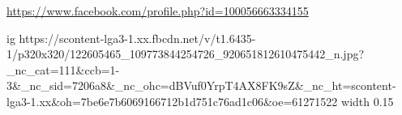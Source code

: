  
 
 
 
 

\url{https://www.facebook.com/profile.php?id=100056663334155}\par
\ifcmt
  ig https://scontent-lga3-1.xx.fbcdn.net/v/t1.6435-1/p320x320/122605465_109773844254726_920651812610475442_n.jpg?_nc_cat=111&ccb=1-3&_nc_sid=7206a8&_nc_ohc=dBVuf0YrpT4AX8FK9sZ&_nc_ht=scontent-lga3-1.xx&oh=7be6e7b6069166712b1d751c76ad1c06&oe=61271522
  width 0.15
\fi

